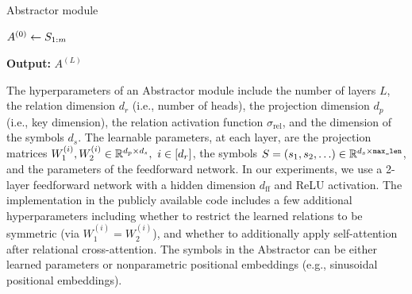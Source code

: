 \begin{algorithm}[ht!]
	\caption{Abstractor module}\label{alg:abstractor_module}

	\vspace{1em}

    $A^{(0)} \gets S_{1:m}$


    \textbf{Output:} $A^{(L)}$

\end{algorithm}

The hyperparameters of an Abstractor module include the number of layers $L$, the relation dimension $d_r$ (i.e., number of heads),  the projection dimension $d_p$ (i.e., key dimension), the relation activation function $\sigma_{\mathrm{rel}}$, and the dimension of the symbols $d_s$. The learnable parameters, at each layer, are the projection matrices $W_1^{(i)}, W_2^{(i)} \in \mathbb{R}^{d_p \times d_s}, \ i \in [d_r]$, the symbols $S = \left(s_1, s_2, \ldots\right) \in \mathbb{R}^{d_s \times \texttt{max\_len}}$, and the parameters of the feedforward network. In our experiments, we use a 2-layer feedforward network with a hidden dimension $d_{\mathrm{ff}}$ and ReLU activation. The implementation in the publicly available code includes a few additional hyperparameters including whether to restrict the learned relations to be symmetric (via $W_1^{(i)} = W_2^{(i)}$), and whether to additionally apply self-attention after relational cross-attention. The symbols in the Abstractor can be either learned parameters or nonparametric positional embeddings (e.g., sinusoidal positional embeddings).

